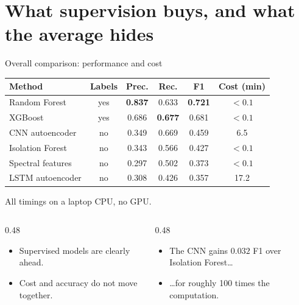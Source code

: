 \documentclass[aspectratio=169,10pt]{beamer}
\newcommand{\good}[1]{\textbf{#1}}
\begin{document}
\section{What supervision buys, and what the average hides}

\begin{frame}{Overall comparison: performance and cost}

  \centering
  \small

  \begin{tabular}{lccccc}
    \toprule
    Method & Labels & Prec. & Rec. & F1 & Cost (min) \\
    \midrule
    Random Forest & yes & \good{0.837} & 0.633 & \good{0.721} & $<0.1$ \\
    XGBoost & yes & 0.686 & \good{0.677} & 0.681 & $<0.1$ \\
    CNN autoencoder & no & 0.349 & 0.669 & 0.459 & 6.5 \\
    Isolation Forest & no & 0.343 & 0.566 & 0.427 & $<0.1$ \\
    Spectral features & no & 0.297 & 0.502 & 0.373 & $<0.1$ \\
    LSTM autoencoder & no & 0.308 & 0.426 & 0.357 & 17.2 \\
    \bottomrule
  \end{tabular}

  \vspace{0.3em}
  {\scriptsize All timings on a laptop CPU, no GPU.}

  \vfill

  \begin{columns}[T]

    \begin{column}{0.48\textwidth}
      \begin{itemize}
        \item Supervised models are clearly ahead.
        \item Cost and accuracy do not move together.
      \end{itemize}
    \end{column}

    \begin{column}{0.48\textwidth}
      \begin{itemize}
        \item The CNN gains $0.032$ F1 over Isolation Forest\ldots
        \item \ldots for roughly 100 times the computation.
      \end{itemize}
    \end{column}

  \end{columns}


\end{frame}
\end{document}
